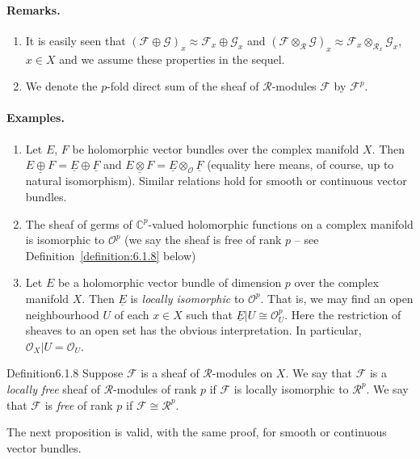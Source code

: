 \paragraph{Remarks.}
\begin{enumerate}
\item It is easily seen that $(\mathcal F\oplus\mathcal G)_x\approx\mathcal F_x\oplus\mathcal G_x$ and $(\mathcal F\otimes_{\mathcal R}\mathcal G)_x\approx\mathcal F_x\otimes_{\mathcal R_x}\mathcal G_x$, $x\in X$ and we assume these properties in the sequel.
\item We denote the $p$-fold direct sum of the sheaf of $\mathcal R$-modules $\mathcal F$ by $\mathcal F^p$.
\end{enumerate}
\paragraph{Examples.}
\begin{enumerate}[start=27]
\item Let $E$, $F$ be holomorphic vector bundles over the complex manifold $X$. Then $\underline{E\oplus F}=\underline E\oplus\underline F$ and $\underline{E\otimes F}=\underline E\otimes_{\mathcal O}\underline F$ (equality here means, of course, up to natural isomorphism). Similar relations hold for smooth or continuous vector bundles.
\item The sheaf of germs of $\mathbb C^p$-valued holomorphic functions on a complex manifold is isomorphic to $\mathcal O^p$ (we say the sheaf is free of rank $p$ -- see Definition~\ref{definition:6.1.8} below)
\item Let $E$ be a holomorphic vector bundle of dimension $p$ over the complex manifold $X$. Then $\underline E$ is \emph{locally isomorphic} to $\mathcal O^p$. That is, we may find an open neighbourhood $U$ of each $x\in X$ such that $\underline E|U\cong\mathcal O_U^p$. Here the restriction of sheaves to an open set has the obvious interpretation. In particular, $\mathcal O_X|U=\mathcal O_U$.
\end{enumerate}
\begin{originaltheorem}{Definition}{6.1.8}
Suppose $\mathcal F$ is a sheaf of $\mathcal R$-modules on $X$. We say that $\mathcal F$ is a \emph{locally free} sheaf of $\mathcal R$-modules of rank $p$ if $\mathcal F$ is locally isomorphic to $\mathcal R^p$. We say that $\mathcal F$ is \emph{free} of rank $p$ if $\mathcal F\cong\mathcal R^p$.
\end{originaltheorem}
The next proposition is valid, with the same proof, for smooth or continuous vector bundles.

